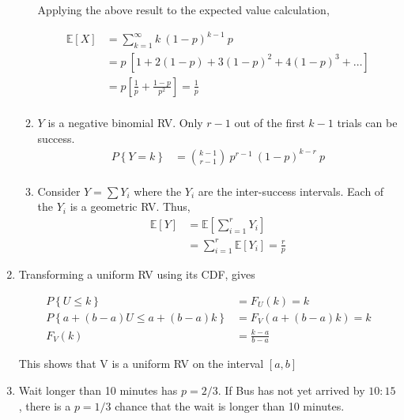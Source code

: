 \begin{enumerate}
\begin{enumerate}
			Applying the above result to the expected value calculation,
			
			\begin{align}
				\mathbb{E}[X] &= \sum\limits_{k = 1}^{\infty} k \ (1-p)^{k-1}\ p \nonumber \\
				&= p\ \left[1 + 2(1-p) + 3(1-p)^2 + 4(1-p)^3 + \dots\right]		\nonumber \\
				&= p \left[\frac{1}{p} + \frac{1-p}{p^2}\right]	= \frac{1}{p} \\
			\end{align}
			
			\item $ Y $ is a negative binomial RV. Only $ r-1 $ out of the first $ k-1 $ trials can be success.
			\begin{align}
				P \left\{Y = k\right\} &= \binom{k-1}{r-1}\ p^{r-1}\ (1-p)^{k-r}\ p \\
			\end{align}
			
			\item Consider $ Y = \sum Y_i $ where the $ Y_i $ are the inter-success intervals. Each of the $ Y_i $ is a geometric RV. Thus,
			\begin{align}
				\mathbb{E}[Y] &= \mathbb{E}\left[\sum\limits_{i = 1}^{r} Y_i\right] \nonumber \\
				&= \sum\limits_{i = 1}^{r} \mathbb{E}[Y_i] = \frac{r}{p}
			\end{align}
			
		\end{enumerate}
	
	
	
	\item Transforming a uniform RV using its CDF, gives
	
		\begin{align}
			P \left\{U \leq k \right\} &= F_U(k) = k \nonumber \\
			P \left\{a + (b-a)U \leq a + (b-a)k \right\} &= F_V (a + (b-a)k) = k \nonumber \\
			F_V(k) &= \frac{k-a}{b-a}
		\end{align}
		
		This shows that V is a uniform RV on the interval $ [a, b] $\\
	 
	
	\item Wait longer than 10 minutes has $ p = 2/3 $.
	If Bus has not yet arrived by $ 10:15 $, there is a $ p = 1/3 $ chance that the wait is longer than 10 minutes.
	

\end{enumerate}
